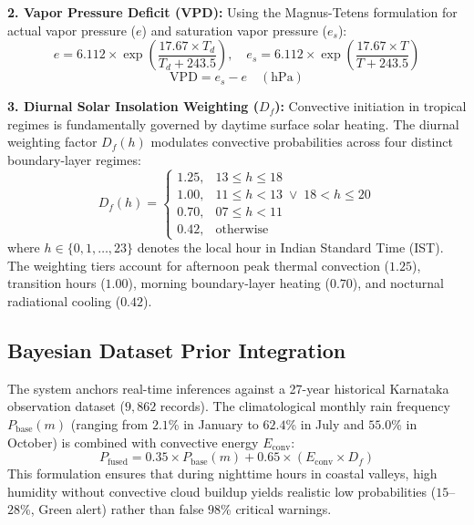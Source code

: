 \documentclass[12pt,a4paper]{report}
\begin{document}
\vspace{0.2cm}
\noindent \textbf{2. Vapor Pressure Deficit (VPD):}
Using the Magnus-Tetens formulation for actual vapor pressure ($e$) and saturation vapor pressure ($e_s$):
\begin{equation}
    e = 6.112 \times \exp\left(\frac{17.67 \times T_d}{T_d + 243.5}\right), \quad e_s = 6.112 \times \exp\left(\frac{17.67 \times T}{T + 243.5}\right)
\end{equation}
\begin{equation}
    \text{VPD} = e_s - e \quad (\text{hPa})
\end{equation}

\vspace{0.2cm}
\noindent \textbf{3. Diurnal Solar Insolation Weighting ($D_f$):}
Convective initiation in tropical regimes is fundamentally governed by daytime surface solar heating. The diurnal weighting factor $D_f(h)$ modulates convective probabilities across four distinct boundary-layer regimes:
\begin{equation}
    D_f(h) = 
    \begin{cases}
        1.25, & 13 \le h \le 18 \\
        1.00, & 11 \le h < 13 \;\lor\; 18 < h \le 20 \\
        0.70, & 07 \le h < 11 \\
        0.42, & \text{otherwise}
    \end{cases}
\end{equation}
where $h \in \{0, 1, \dots, 23\}$ denotes the local hour in Indian Standard Time (IST). The weighting tiers account for afternoon peak thermal convection ($1.25$), transition hours ($1.00$), morning boundary-layer heating ($0.70$), and nocturnal radiational cooling ($0.42$).

\subsection{Bayesian Dataset Prior Integration}
The system anchors real-time inferences against a 27-year historical Karnataka observation dataset ($9,862$ records). The climatological monthly rain frequency $P_{\text{base}}(m)$ (ranging from $2.1$\% in January to $62.4$\% in July and $55.0$\% in October) is combined with convective energy $E_{\text{conv}}$:
\begin{equation}
    P_{\text{fused}} = 0.35 \times P_{\text{base}}(m) + 0.65 \times \left(E_{\text{conv}} \times D_f\right)
\end{equation}
This formulation ensures that during nighttime hours in coastal valleys, high humidity without convective cloud buildup yields realistic low probabilities ($15$--$28$\%, Green alert) rather than false $98$\% critical warnings.
\end{document}
